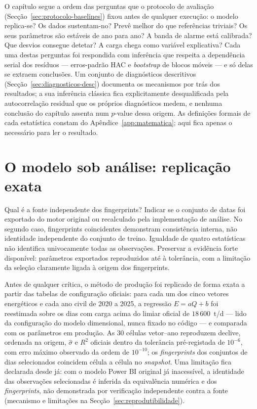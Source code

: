 O capítulo segue a ordem das perguntas que o protocolo de avaliação
(Secção~\ref{sec:protocolo-baselines}) fixou antes de qualquer execução:
o modelo replica-se? Os dados sustentam-no? Prevê melhor do que referências
triviais? Os seus parâmetros são estáveis de ano para ano? A banda de alarme
está calibrada? Que desvios consegue detetar? A carga chega como variável
explicativa? Cada uma destas perguntas foi respondida com inferência que
respeita a dependência serial dos resíduos --- erros-padrão HAC e
\emph{bootstrap} de blocos móveis --- e só delas se extraem conclusões. Um
conjunto de diagnósticos descritivos (Secção~\ref{sec:diagnosticos-desc})
documenta os mecanismos por trás dos resultados; a sua inferência clássica
fica explicitamente desqualificada pela autocorrelação residual que os
próprios diagnósticos medem, e nenhuma conclusão do capítulo assenta num
$p$-value dessa origem. As definições formais de cada estatística constam do
Apêndice~\ref{app:matematica}; aqui fica apenas o necessário para ler o
resultado.

\section{O modelo sob análise: replicação exata}
\label{sec:replicacao}
{Qual é a fonte independente dos fingerprints?}
{Indicar se o conjunto de datas foi exportado do motor original ou
recalculado pela implementação de análise. No segundo caso, fingerprints
coincidentes demonstram consistência interna, não identidade independente
do conjunto de treino. Igualdade de quatro estatísticas não identifica
univocamente todas as observações. Preservar a evidência forte disponível:
parâmetros exportados reproduzidos até à tolerância, com a limitação da
seleção claramente ligada à origem dos fingerprints.}%

Antes de qualquer crítica, o método de produção foi replicado de forma exata a
partir das tabelas de configuração oficiais: para cada um dos cinco vetores
energéticos e cada ano civil de 2020 a 2025, a regressão $E = aQ + b$ foi
reestimada sobre os dias com carga acima do limiar oficial de
$18\,600$~t/d --- lido da configuração do modelo dimensional, nunca fixado no
código --- e comparada com os parâmetros em produção. As 30 células
vetor--ano reproduzem declive, ordenada na origem, $\hat\sigma$ e $R^2$
oficiais dentro da tolerância pré-registada de $10^{-6}$, com erro máximo
observado da ordem de $10^{-10}$; os \emph{fingerprints} dos conjuntos de
dias selecionados coincidem célula a célula no \emph{snapshot}. Uma
limitação fica declarada desde já: com o modelo Power BI original já
inacessível, a identidade das observações selecionadas é inferida da
equivalência numérica e dos \emph{fingerprints}, não demonstrada por
verificação independente contra a fonte
(mecanismo e limitações na Secção~\ref{sec:reprodutibilidade}).


